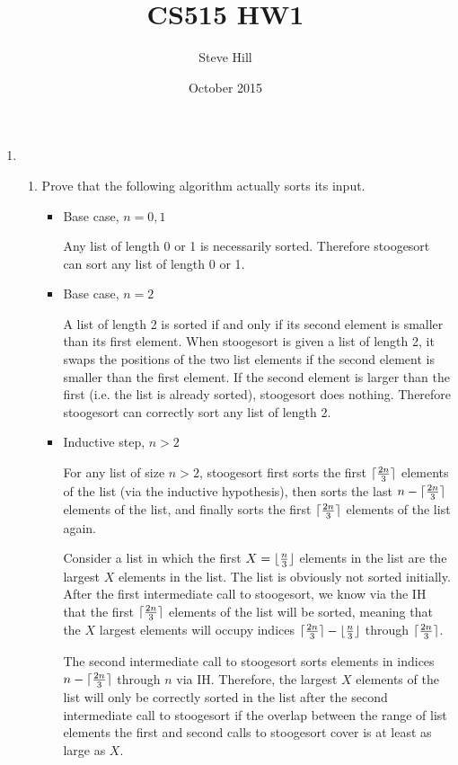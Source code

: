 \documentclass{article}
\title{CS515 HW1}
\author{Steve Hill}
\date{October 2015}
\DeclarePairedDelimiter{\ceil}{\lceil}{\rceil}
\DeclarePairedDelimiter{\floor}{\lfloor}{\rfloor}
\begin{document}
\maketitle

\begin{enumerate}
\item 
    \begin{enumerate}
    \item 
    Prove that the following algorithm actually sorts its input.

  \begin{itemize}
  \item Base case, $n=0,1$

  Any list of length 0 or 1 is necessarily sorted. Therefore stoogesort can sort any list of length 0 or 1.

  \item Base case, $n=2$

  A list of length 2 is sorted if and only if its second element is smaller than its first element. 
  When stoogesort is given a list of length 2, it swaps the positions of the two list elements if the second element is smaller than the first element. If the second element is larger than the first (i.e. the list is already sorted), stoogesort does nothing.
  Therefore stoogesort can correctly sort any list of length 2.

  \item Inductive step, $n>2$

  For any list of size $n > 2$, stoogesort first sorts the first $\ceil{\frac{2n}{3}}$ elements of the list (via the inductive hypothesis), then sorts the last $n-\ceil{\frac{2n}{3}}$ elements of the list, and finally sorts the first $\ceil{\frac{2n}{3}}$ elements of the list again.

  Consider a list in which the first $X=\floor{\frac{n}{3}}$ elements in the list are the largest $X$ elements in the list. The list is obviously not sorted initially. After the first intermediate call to stoogesort, we know via the IH that the first $\ceil{\frac{2n}{3}}$ elements of the list will be sorted, meaning that the $X$ largest elements will occupy indices $\ceil{\frac{2n}{3}}-\floor{\frac{n}{3}}$ through $\ceil{\frac{2n}{3}}$. 

  The second intermediate call to stoogesort sorts elements in indices $n-\ceil{\frac{2n}{3}}$ through $n$ via IH. Therefore, the largest $X$ elements of the list will only be correctly sorted in the list after the second intermediate call to stoogesort if the overlap between the range of list elements the first and second calls to stoogesort cover is at least as large as $X$.


\end{itemize}
\end{enumerate}
\end{enumerate}
\end{document}
